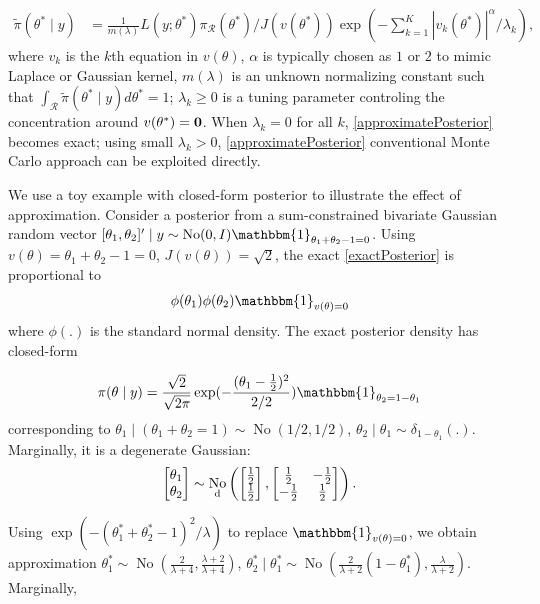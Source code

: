 \documentclass[10pt,fleqn]{article}
\newcommand{\be}{\begin{equation}\begin{aligned}}
\newcommand{\ee}{\end{aligned}\end{equation}}
\newcommand{\mc}[1]{\mathcal{#1}}
\DeclareMathOperator{\No}{No}
\DeclareMathOperator{\1}{\mathbbm{1}}
\begin{document}
\be
\label{approximatePosterior}
\tilde{\pi}(\theta^*\mid y)  & = \frac{1}{m(\lambda)} L(y;\theta^*) \pi_{\mc
R}(\theta^*) /J(v(\theta^*)) \exp (- \sum_{k=1}^K |v_k(\theta^*)|^\alpha/\lambda_k),
\ee
where $v_k$ is the $k$th equation in $v(\theta)$, $\alpha$ is
typically chosen as $1$ or $2$ to mimic Laplace or Gaussian kernel, $m(\lambda)$ is an unknown normalizing
constant such that $\int_{\mc R} \tilde{\pi}(\theta^*\mid y) d\theta^*=1$;
 $\lambda_k\ge 0$ is a
tuning parameter controling the concentration around $v(\theta^*)=\bf 0$.
When $\lambda_k=0$ for all $k$, 
\eqref{approximatePosterior} becomes exact; using small $\lambda_k>0$, \eqref{approximatePosterior}
 conventional Monte Carlo approach can be exploited directly.

We use a toy example with closed-form posterior to illustrate the effect of approximation. Consider a posterior from a sum-constrained
bivariate Gaussian random vector $[\theta_1,\theta_2]' \mid y \sim \No(0,I)
\mathbbm{1}_{\theta_1+\theta_2-1=0}$. Using
$v(\theta)=\theta_1+\theta_2-1=0$, $J(v(\theta))=\sqrt 2$, the exact \eqref{exactPosterior} is proportional to 
$$
\phi(\theta_1)
\phi(\theta_2)\mathbbm{1}_{v(\theta)=0}
$$
where $\phi(.)$ is the standard
normal density. The exact posterior density has closed-form

$$
\pi(\theta\mid y)=\frac{\sqrt{2}}{\sqrt{2\pi}} \exp(-\frac{(\theta_1-\frac{1}{2})^2}{2/2})
\mathbbm{1}_{\theta_2=1-\theta_1}
$$
corresponding to $\theta_1\mid (\theta_1+ \theta_2=1) \sim
\No(1/2,1/2)$, $\theta_2\mid \theta_1 \sim \delta_{1-\theta_1}(.)$.
 Marginally, it is a degenerate Gaussian:
$$\begin{bmatrix} \theta_1 \\ \theta_2 \end{bmatrix} \sim
\No_{\text d} \left(
\begin{bmatrix} \frac{1}{2} \\ \frac{1}{2} \end{bmatrix},
\begin{bmatrix} \frac{1}{2} & -\frac{1}{2}  \\  -\frac{1}{2}  & \frac{1}{2} \end{bmatrix}
\right).$$

Using $ \exp( - (\theta^*_1+\theta^*_2-1)^2/\lambda)$ to
replace $\mathbbm{1}_{v(\theta)=0}$, we obtain approximation $\theta^*_1 \sim \No(\frac{2}{\lambda+4},\frac{\lambda+2}{\lambda+4})$, $\theta^*_2\mid \theta^*_1 \sim \No(\frac{2}{\lambda+2}(1-\theta^*_1),\frac{\lambda}{\lambda+2})$. Marginally, 
\end{document}
